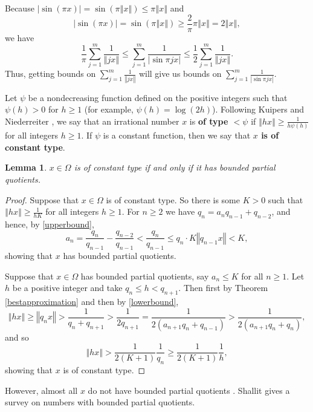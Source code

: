 \documentclass{amsart}
\newcommand{\norm}[1]{\left\Vert #1 \right\Vert}
\newtheorem{lemma}[theorem]{Lemma}
\begin{document}
Because $|\sin (\pi x)| = \sin(\pi \norm{x}) 
\leq \pi \norm{x}$ and
\[
|\sin (\pi x)| = \sin(\pi \norm{x}) \geq \frac{2}{\pi} \pi \norm{x}=2\norm{x},
\]
we have
\begin{equation}
\frac{1}{\pi} \sum_{j=1}^m \frac{1}{\norm{jx}} 
\leq \sum_{j=1}^m \frac{1}{|\sin \pi  j x |} 
\leq \frac{1}{2} \sum_{j=1}^m  \frac{1}{\norm{jx}} .
\label{sinebound}
\end{equation}
Thus, getting bounds on $\sum_{j=1}^m \frac{1}{\norm{jx}}$ will give us bounds on $\sum_{j=1}^m \frac{1}{|\sin \pi  j x|}$.

Let $\psi$ be a nondecreasing function defined on the positive integers such that $\psi(h)>0$ for $h  \geq 1$ (for example, $\psi(h)=\log(2h)$). Following Kuipers and Niederreiter \cite[p.~121, Definition 3.3]{kuipers}, we say that 
an irrational number $x$ is \textbf{of type $<\psi$} if $\norm{hx} \geq \frac{1}{h\psi(h)}$ for all  integers $h \geq 1$.
If $\psi$ is a constant function, then we say that
\textbf{$x$ is of constant type}.

\begin{lemma}
$x \in \Omega$ is of constant type if and only if it has bounded partial quotients.
\label{constanttype}
\end{lemma}
\begin{proof}
Suppose that $x \in \Omega$ is of constant type. So there is some $K>0$ such that $\norm{hx} \geq \frac{1}{hK}$ for all integers $h \geq 1$. For $n \geq 2$
we have $q_n=a_n q_{n-1}+q_{n-2}$, and hence, by \eqref{upperbound},
\[
a_n=\frac{q_n}{q_{n-1}}-\frac{q_{n-2}}{q_{n-1}}
<\frac{q_n}{q_{n-1}}
\leq q_n \cdot K\norm{q_{n-1}x}
< K,
\]
showing that $x$ has bounded partial quotients.

Suppose that $x \in \Omega$ has bounded partial quotients, say $a_n \leq K$ for all $n \geq 1$. Let $h$ be a positive integer and take $q_n \leq h
< q_{n+1}$. Then first by Theorem \ref{bestapproximation} and then by \eqref{lowerbound},
\[
\norm{hx} \geq \norm{q_n x} > \frac{1}{q_n+q_{n+1}} > \frac{1}{2q_{n+1}}
=\frac{1}{2(a_{n+1}q_n+q_{n-1})}
>\frac{1}{2(a_{n+1}q_n+q_n)},
\]
and so
\[
\norm{hx} > \frac{1}{2(K+1)} \frac{1}{q_n} \geq \frac{1}{2(K+1)}  \frac{1}{h},
\]
showing that $x$ is of constant type.
\end{proof}

However, almost all $x$ do not have bounded partial quotients \cite[p.~60, Theorem 29]{MR1451873}. Shallit \cite{MR1175525} gives a survey on numbers with bounded partial quotients.
\end{document}

